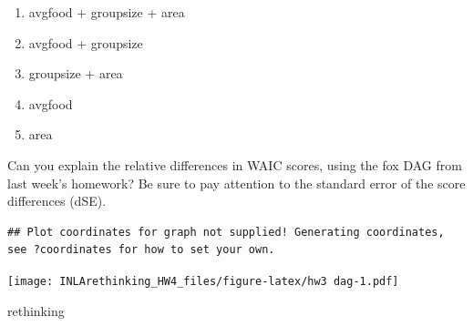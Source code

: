 \documentclass[
]{article}
\newenvironment{Shaded}{\begin{snugshade}}{\end{snugshade}}
\newcommand{\KeywordTok}[1]{\textcolor[rgb]{0.13,0.29,0.53}{\textbf{#1}}}
\newcommand{\NormalTok}[1]{#1}
\newcommand{\OperatorTok}[1]{\textcolor[rgb]{0.81,0.36,0.00}{\textbf{#1}}}
\newcommand{\StringTok}[1]{\textcolor[rgb]{0.31,0.60,0.02}{#1}}
\providecommand{\tightlist}{%
  \setlength{\itemsep}{0pt}\setlength{\parskip}{0pt}}
\begin{document}
\begin{enumerate}
\def\labelenumi{(\arabic{enumi})}
\tightlist
\item
  avgfood + groupsize + area
\item
  avgfood + groupsize
\item
  groupsize + area
\item
  avgfood
\item
  area
\end{enumerate}

Can you explain the relative differences in WAIC scores, using the fox
DAG from last week's homework? Be sure to pay attention to the standard
error of the score differences (dSE).

\begin{verbatim}
## Plot coordinates for graph not supplied! Generating coordinates, see ?coordinates for how to set your own.
\end{verbatim}

\texttt{[image: INLArethinking\_HW4\_files/figure-latex/hw3 dag-1.pdf]}

\begin{Shaded}
\end{Shaded}

rethinking
\end{document}
